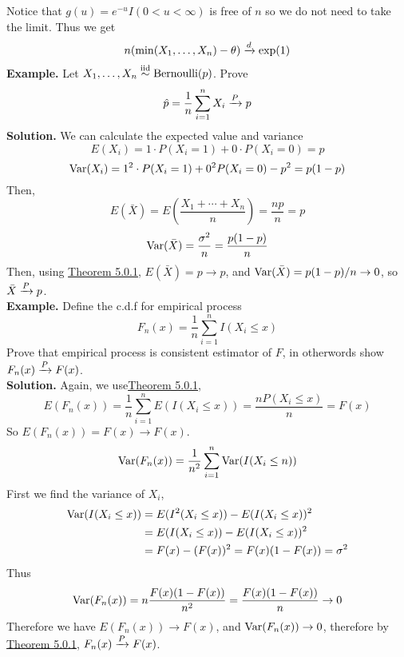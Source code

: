 Notice that $g(u) = e^{-u}I(0 < u < \infty)$ is free of $n$ so we do not need to take the limit. Thus we get 
\[n(\min(X_1,\ldots,X_n) - \theta) \xrightarrow{d} \exp(1)\]
\textbf{Example.} Let $X_1,\ldots, X_n \overset{\mathrm{iid}}{\sim} \operatorname{Bernoulli}(p)$. Prove 
\[\hat{p} = \frac{1}{n}\sum_{i=1}^nX_i \xrightarrow{P} p\]
\textbf{Solution.} We can calculate the expected value and variance 
\[E(X_i) = 1 \cdot P(X_i = 1) + 0 \cdot P(X_i=  0) = p \]
\[\operatorname{Var}(X_i) = 1^2\cdot P(X_i = 1) + 0^2 P(X_i = 0) - p^2 = p(1-p)\]
Then, 
\[E(\bar{X}) = E\left(\frac{X_1 + \cdots + X_n}{n}\right) = \frac{np}{n} = p\]
\[\operatorname{Var}(\bar{X}) = \frac{\sigma^2}{n} = \frac{p(1-p)}{n}\]
Then, using \hyperref[theorem:5.0.1]{Theorem 5.0.1}, $E(\bar{X}) = p \rightarrow p$, and $\operatorname{Var}(\bar{X}) = p(1-p)/n \rightarrow 0$, so $\bar{X}\xrightarrow{P} p$.\\[2ex]
\textbf{Example.} Define the c.d.f for empirical process 
\[F_n(x) = \frac{1}{n}\sum_{i=1}^nI(X_i \leq x)\]
Prove that empirical process is consistent estimator of $F$, in otherwords show $F_n(x) \xrightarrow{P} F(x)$.\\[2ex]
\textbf{Solution.} Again, we use\hyperref[theorem:5.0.1]{Theorem 5.0.1},
\[E(F_n(x)) = \frac{1}{n}\sum_{i=1}^n E(I(X_i\leq x)) = \frac{nP(X_i\leq x)}{n} = F(x)\]
So $E(F_n(x)) = F(x) \rightarrow F(x)$. 
\[\operatorname{Var}(F_n(x)) = \frac{1}{n^2}\sum_{i=1}^n \operatorname{Var}(I(X_i \leq n))\]
First we find the variance of $X_i$, 
\begin{align*}
    \operatorname{Var}(I(X_i \leq x)) &= E(I^2(X_i \leq x)) - E(I(X_i \leq x))^2\\
    &= E(I(X_i \leq x)) - E(I(X_i \leq x))^2\\
    &= F(x) - (F(x))^2 = F(x)(1 - F(x)) = \sigma^2
\end{align*}
Thus 
\[\operatorname{Var}(F_n(x)) = n\frac{F(x)(1-F(x))}{n^2} = \frac{F(x)(1-F(x))}{n} \rightarrow 0\]
Therefore we have $E(F_n(x)) \rightarrow F(x)$, and $\operatorname{Var}(F_n(x)) \rightarrow 0$, therefore by  \hyperref[theorem:5.0.1]{Theorem 5.0.1}, $F_n(x) \xrightarrow{P} F(x)$.

